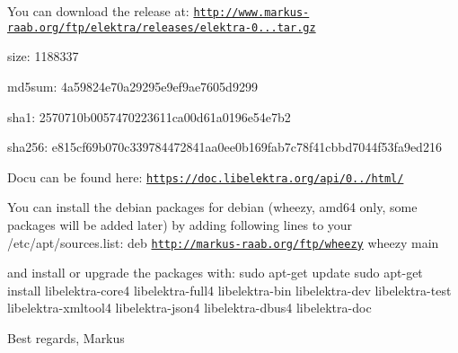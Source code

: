 You can download the release at\+: \href{http://www.markus-raab.org/ftp/elektra/releases/elektra-0.8.6.tar.gz}{\tt http\+://www.\+markus-\/raab.\+org/ftp/elektra/releases/elektra-\/0...\+tar.\+gz}


\begin{DoxyItemize}
\item size\+: 1188337
\item md5sum\+: 4a59824e70a29295e9ef9ae7605d9299
\item sha1\+: 2570710b0057470223611ca00d61a0196e54e7b2
\item sha256\+: e815cf69b070c339784472841aa0ee0b169fab7c78f41cbbd7044f53fa9ed216
\end{DoxyItemize}

Docu can be found here\+: \href{https://doc.libelektra.org/api/0.8.6/html/}{\tt https\+://doc.\+libelektra.\+org/api/0../html/}

You can install the debian packages for debian (wheezy, amd64 only, some packages will be added later) by adding following lines to your /etc/apt/sources.list\+: deb \href{http://markus-raab.org/ftp/wheezy}{\tt http\+://markus-\/raab.\+org/ftp/wheezy} wheezy main

and install or upgrade the packages with\+: sudo apt-\/get update sudo apt-\/get install libelektra-\/core4 libelektra-\/full4 libelektra-\/bin libelektra-\/dev libelektra-\/test libelektra-\/xmltool4 libelektra-\/json4 libelektra-\/dbus4 libelektra-\/doc

Best regards, Markus 
